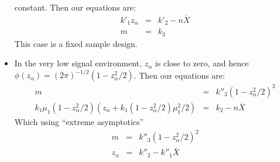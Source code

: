 \documentclass{article}
\begin{document}
\begin{itemize}
constant.  Then our equations are:
\begin{eqnarray*}
k'_1 z_\alpha &=& k'_2 - n \overline{X} \\
m &= &k_3
\end{eqnarray*}
This case is a fixed sample design.
\item In the very low signal environment, $z_\alpha$ is close to zero,
and hence $\phi(z_\alpha) = (2\pi)^{-1/2}(1 - z_\alpha^2/2)$.  Then
our equations are:
\begin{eqnarray*}
m &= &k''_3 (1 - z_\alpha^2/2)^2 \\
k_1 \mu_1 (1 - z_\alpha^2/2)(z_\alpha + k_1(1 - z_\alpha^2/2)\mu_1^2/2) &=& k_2 - n \overline{X} 
\end{eqnarray*}
Which using ``extreme asymptotics''
\begin{eqnarray*}
m &= &k''_3 (1 - z_\alpha^2/2)^2 \\
z_\alpha &=& k''_2 - k''_1 \overline{X} 
\end{eqnarray*}
\end{itemize}
\end{document}
